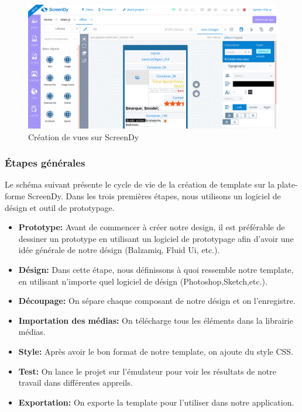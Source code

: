 \documentclass[12pt,a4paper]{report}
\begin{document}
		
		\begin{figure}[!hbtp]
			\centering
			\includegraphics[scale=0.3]{./graphics/vue_screendy.png}
			\caption{Création de vues sur ScreenDy}
		\end{figure}
		\newpage

	
			\subsubsection{\'Etapes générales}
Le schéma suivant présente le cycle de vie de la création de template sur la plate-forme ScreenDy.
Dans les trois premières étapes, nous utilisons un logiciel de désign et outil de prototypage.\\
		
			\begin{itemize}
				\item \textbf{Prototype:} Avant de commencer à créer notre design, il est préférable de dessiner un prototype en utilisant un logiciel de prototypage afin d'avoir une idée générale de notre désign (Balzamiq, Fluid Ui, etc.).
				\item \textbf{Désign:} Dans cette étape, nous définissons à quoi ressemble notre template, en utilisant n'importe quel logiciel de désign (Photoshop,Sketch,etc.).
				\item \textbf{Découpage:} On sépare chaque composant de notre désign et on l'enregistre.
				\item \textbf{Importation des médias:} On télécharge tous les éléments dans la librairie médias.
				\item \textbf{Style:} Après avoir le bon format de notre template, on ajoute du style CSS.
				\item \textbf{Test:} On lance le projet sur l'émulateur pour voir les résultats de notre travail dans différentes appreils.
				\item \textbf{Exportation:} On exporte la template pour l'utiliser dans notre application.
			\end{itemize}
		
\end{document}
